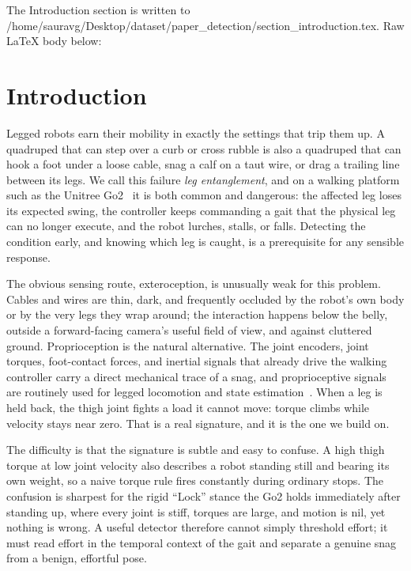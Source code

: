 The Introduction section is written to /home/sauravg/Desktop/dataset/paper_detection/section_introduction.tex. Raw LaTeX body below:

\section{Introduction}

Legged robots earn their mobility in exactly the settings that trip them up. A quadruped that can step over a curb or cross rubble is also a quadruped that can hook a foot under a loose cable, snag a calf on a taut wire, or drag a trailing line between its legs. We call this failure \emph{leg entanglement}, and on a walking platform such as the Unitree Go2~\cite{unitree_go2} it is both common and dangerous: the affected leg loses its expected swing, the controller keeps commanding a gait that the physical leg can no longer execute, and the robot lurches, stalls, or falls. Detecting the condition early, and knowing which leg is caught, is a prerequisite for any sensible response.

The obvious sensing route, exteroception, is unusually weak for this problem. Cables and wires are thin, dark, and frequently occluded by the robot's own body or by the very legs they wrap around; the interaction happens below the belly, outside a forward-facing camera's useful field of view, and against cluttered ground. Proprioception is the natural alternative. The joint encoders, joint torques, foot-contact forces, and inertial signals that already drive the walking controller carry a direct mechanical trace of a snag, and proprioceptive signals are routinely used for legged locomotion and state estimation~\cite{hwangbo2019learning,lee2020learning,camurri2017contact}. When a leg is held back, the thigh joint fights a load it cannot move: torque climbs while velocity stays near zero. That is a real signature, and it is the one we build on.

The difficulty is that the signature is subtle and easy to confuse. A high thigh torque at low joint velocity also describes a robot standing still and bearing its own weight, so a naive torque rule fires constantly during ordinary stops. The confusion is sharpest for the rigid ``Lock'' stance the Go2 holds immediately after standing up, where every joint is stiff, torques are large, and motion is nil, yet nothing is wrong. A useful detector therefore cannot simply threshold effort; it must read effort in the temporal context of the gait and separate a genuine snag from a benign, effortful pose.

